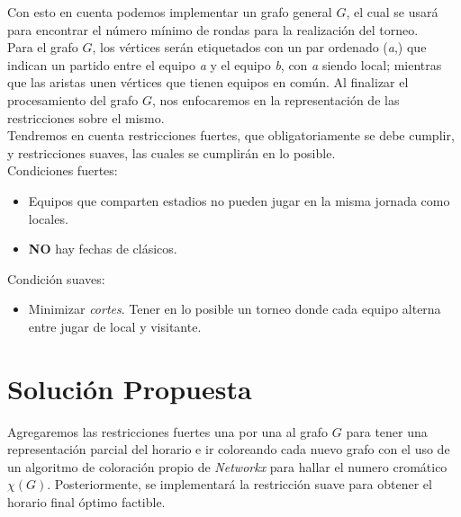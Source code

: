 \documentclass[11pt]{article}
\begin{document}
\begin{multicols}{2}
            Con esto en cuenta podemos implementar un grafo general $G$, el cual se usará para 
            encontrar el número mínimo de rondas para la realización del torneo.\\
            Para el grafo $G$, los vértices serán etiquetados con un par ordenado (\textit{a},) que indican un 
            partido entre el equipo \textit{a} y el equipo \textit{b}, con \textit{a} siendo local; mientras que las aristas unen 
            vértices que tienen equipos en común. Al finalizar el procesamiento del grafo $G$, nos enfocaremos en la representación de las restricciones
            sobre el mismo.\\[10pt]
            Tendremos en cuenta restricciones fuertes, que obligatoriamente se debe cumplir, y restricciones 
            suaves, las cuales se cumplirán en lo posible.\\[10pt]
            Condiciones fuertes:
            \begin{itemize}
                \item Equipos que comparten estadios no pueden jugar en la misma jornada como locales.
                \item \textbf{NO} hay fechas de clásicos.
            \end{itemize}
            Condición suaves:
            \begin{itemize}  
                \item Minimizar \textit{cortes}. Tener en lo posible un torneo donde cada equipo alterna entre jugar de local y visitante.     
            \end{itemize}

        \section{Solución Propuesta}
            Agregaremos las restricciones fuertes una por una al grafo $G$ para tener una representación parcial del horario e ir coloreando cada nuevo grafo con el uso de un algoritmo de coloración propio de \textit{Networkx} 
            para hallar el numero cromático $\chi(G)$. Posteriormente, se implementará la restricción suave para obtener el horario final óptimo factible. 
        

\end{multicols}
\end{document}
